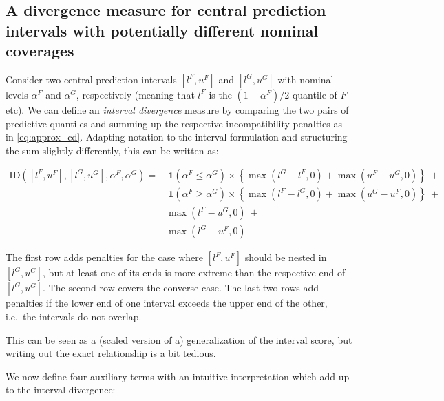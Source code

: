 \documentclass[
]{article}
\begin{document}
\hypertarget{a-divergence-measure-for-central-prediction-intervals-with-potentially-different-nominal-coverages}{%
\subsection{A divergence measure for central prediction intervals with
potentially different nominal
coverages}\label{a-divergence-measure-for-central-prediction-intervals-with-potentially-different-nominal-coverages}}

Consider two central prediction intervals \([l^F, u^F]\) and
\([l^G, u^G]\) with nominal levels \(\alpha^F\) and \(\alpha^G\),
respectively (meaning that \(l^F\) is the \((1 - \alpha^F)/2\) quantile
of \(F\) etc). We can define an \textit{interval divergence} measure by
comparing the two pairs of predictive quantiles and summing up the
respective incompatibility penalties as in \eqref{eq:approx_cd}.
Adapting notation to the interval formulation and structuring the sum
slightly differently, this can be written as:

\begin{align*}
\text{ID}([l^F, u^F], [l^G, u^G], \alpha^F, \alpha^G) = & \ \mathbf{1}(\alpha^F \leq \alpha^G)\times\left\{\max(l^G - l^F, 0) + \max(u^F - u^G, 0)\right\} \ +\\
& \ \mathbf{1}(\alpha^F \geq \alpha^G) \times \left\{\max(l^F - l^G, 0) + \max(u^G - u^F, 0)\right\} \ +\\
& \max(l^F - u^G, 0) \ +\\
& \max(l^G - u^F, 0)
\end{align*}

The first row adds penalties for the case where \([l^F, u^F]\) should be
nested in \([l^G, u^G]\), but at least one of its ends is more extreme
than the respective end of \([l^G, u^G]\). The second row covers the
converse case. The last two rows add penalties if the lower end of one
interval exceeds the upper end of the other, i.e.~the intervals do not
overlap.

This can be seen as a (scaled version of a) generalization of the
interval score, but writing out the exact relationship is a bit tedious.

We now define four auxiliary terms with an intuitive interpretation
which add up to the interval divergence:
\end{document}
